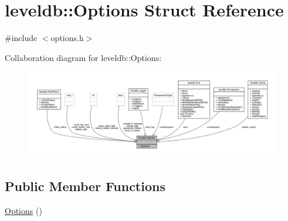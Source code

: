 \hypertarget{structleveldb_1_1_options}{}\section{leveldb\+::Options Struct Reference}
\label{structleveldb_1_1_options}


{\ttfamily \#include $<$options.\+h$>$}



Collaboration diagram for leveldb\+::Options\+:
\nopagebreak
\begin{figure}[H]
\begin{center}
\leavevmode
\includegraphics[width=350pt]{structleveldb_1_1_options__coll__graph}
\end{center}
\end{figure}
\subsection*{Public Member Functions}
\begin{DoxyCompactItemize}
\item 
\mbox{\hyperlink{structleveldb_1_1_options_a52d77c894795ba83077045daeab3d581}{Options}} ()
\end{DoxyCompactItemize}
